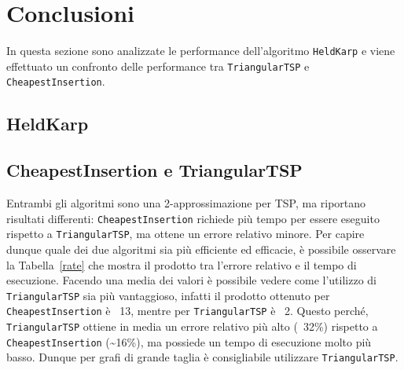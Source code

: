 \section{Conclusioni}
In questa sezione sono analizzate le performance dell'algoritmo \texttt{HeldKarp} e viene effettuato un confronto delle performance tra \texttt{TriangularTSP} e \texttt{CheapestInsertion}.

\subsection{HeldKarp}

\subsection{CheapestInsertion e TriangularTSP}
Entrambi gli algoritmi sono una 2-approssimazione per TSP, ma riportano risultati differenti: \texttt{CheapestInsertion} richiede più tempo per essere eseguito rispetto a \texttt{TriangularTSP}, ma ottene un errore relativo minore. Per capire dunque quale dei due algoritmi sia più efficiente ed efficacie, è possibile osservare la Tabella~\ref{rate} che mostra il prodotto tra l'errore relativo e il tempo di esecuzione. Facendo una media dei valori è possibile vedere come l'utilizzo di \texttt{TriangularTSP} sia più vantaggioso, infatti il prodotto ottenuto per \texttt{CheapestInsertion} è ~13, mentre per \texttt{TriangularTSP} è ~2. Questo perché, \texttt{TriangularTSP} ottiene in media un errore relativo più alto (~32\%) rispetto a \texttt{CheapestInsertion} (\textasciitilde 16\%), ma possiede un tempo di esecuzione molto più basso. Dunque per grafi di grande taglia è consigliabile utilizzare \texttt{TriangularTSP}.

